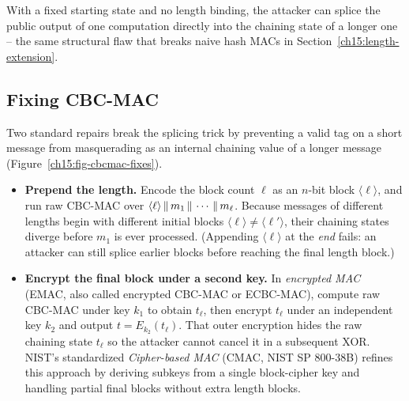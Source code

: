 \begin{attackbox}
\begin{center}
\end{center}

With a fixed starting state and no length binding, the attacker can splice the public output of one computation directly into the chaining state of a longer one -- the same structural flaw that breaks naive hash MACs in Section~\ref{ch15:length-extension}.
\end{attackbox}

\subsection{Fixing CBC-MAC}
\label{ch15:cbcmac-fix}

Two standard repairs break the splicing trick by preventing a valid tag on a short message from masquerading as an internal chaining value of a longer message (Figure~\ref{ch15:fig-cbcmac-fixes}).

\begin{itemize}
  \item \textbf{Prepend the length.} Encode the block count $\ell$ as an $n$-bit block $\langle\ell\rangle$, and run raw CBC-MAC over $\langle\ell\rangle \,\|\, m_1 \,\|\, \cdots \,\|\, m_\ell$. Because messages of different lengths begin with different initial blocks $\langle\ell\rangle \ne \langle\ell'\rangle$, their chaining states diverge before $m_1$ is ever processed. (Appending $\langle\ell\rangle$ at the \emph{end} fails: an attacker can still splice earlier blocks before reaching the final length block.)
  \item \textbf{Encrypt the final block under a second key.} In \emph{encrypted MAC} (EMAC, also called encrypted CBC-MAC or ECBC-MAC), compute raw CBC-MAC under key $k_1$ to obtain $t_\ell$, then encrypt $t_\ell$ under an independent key $k_2$ and output $t = E_{k_2}(t_\ell)$. That outer encryption hides the raw chaining state $t_\ell$ so the attacker cannot cancel it in a subsequent XOR. NIST's standardized \emph{Cipher-based MAC} (CMAC, NIST SP 800-38B) refines this approach by deriving subkeys from a single block-cipher key and handling partial final blocks without extra length blocks.
\end{itemize}

